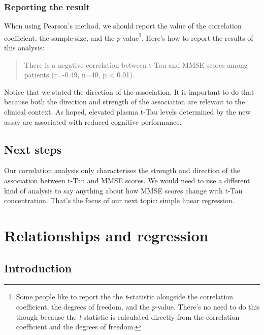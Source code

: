 \documentclass[
]{book}
\begin{document}
\hypertarget{reporting-the-result}{%
\subsection{Reporting the result}\label{reporting-the-result}}

When using Pearson's method, we should report the value of the correlation coefficient, the sample size, and the \emph{p}-value\footnote{Some people like to report the the \emph{t}-statistic alongside the correlation coefficient, the degrees of freedom, and the \emph{p}-value. There's no need to do this though because the \emph{t}-statistic is calculated directly from the correlation coefficient and the degrees of freedom.}. Here's how to report the results of this analysis:

\begin{quote}
There is a negative correlation between t-Tau and MMSE scores among patients (r=-0.49, n=40, p \textless{} 0.01).
\end{quote}

Notice that we stated the direction of the association. It is important to do that because both the direction and strength of the association are relevant to the clinical context. As hoped, elevated plasma t-Tau levels determined by the new assay are associated with reduced cognitive performance.

\hypertarget{next-steps}{%
\section{Next steps}\label{next-steps}}

Our correlation analysis only characterises the strength and direction of the association between t-Tau and MMSE scores. We would need to use a different kind of analysis to say anything about how MMSE scores change with t-Tau concentration. That's the focus of our next topic: simple linear regression.

\hypertarget{relationships-and-regression}{%
\chapter{Relationships and regression}\label{relationships-and-regression}}

\hypertarget{introduction-1}{%
\section{Introduction}\label{introduction-1}}
\end{document}
